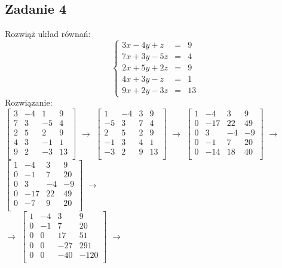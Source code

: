 \documentclass[10pt]{mwart}
\theoremstyle{plain} \newtheorem{tw}{Twierdzenie}[section]
\theoremstyle{plain} \newtheorem{lem}[tw]{Lemat}
\theoremstyle{definition} \newtheorem{df}[tw]{Definicja}
\begin{document}
\subsection{Zadanie 4}
Rozwiąż układ równań:
$$\left\{\begin{array}{rcl}
3x - 4y +z&=&9\\
7x + 3y - 5z&=&4\\
2x + 5y + 2z&=&9\\
4x + 3y - z&=&1\\
9x + 2y - 3z&=&13
\end{array} \right.$$\cite{odnośnik2}
Rozwiązanie:\\
\(\begin{bmatrix}
3&-4&1&9\\
7&3&-5&4\\
2&5&2&9\\
4&3&-1&1\\
9&2&-3&13\\
\end{bmatrix}\) \(\to\)
\(\begin{bmatrix}
1&-4&3&9\\
-5&3&7&4\\
2&5&2&9\\
-1&3&4&1\\
-3&2&9&13\\
\end{bmatrix}\) \(\to\)
\(\begin{bmatrix}
1&-4&3&9\\
0&-17&22&49\\
0&3&-4&-9\\
0&-1&7&20\\
0&-14&18&40\\
\end{bmatrix}\) \(\to\)
\(\begin{bmatrix}
1&-4&3&9\\
0&-1&7&20\\
0&3&-4&-9\\
0&-17&22&49\\
0&-7&9&20\\
\end{bmatrix}\) \(\to\)\\ \(\to\)
\(\begin{bmatrix}
1&-4&3&9\\
0&-1&7&20\\
0&0&17&51\\
0&0&-27&291\\
0&0&-40&-120\\
\end{bmatrix}\) \(\to\)
\end{document}
